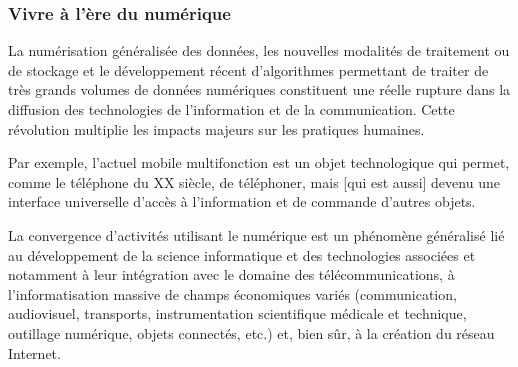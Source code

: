 \subsubsection*{Vivre à l'ère du numérique}

La numérisation généralisée des données, les nouvelles modalités de traitement ou de stockage et le développement récent d’algorithmes permettant de traiter de très grands volumes de données numériques constituent une réelle rupture dans la diffusion des technologies de l’information et de la communication. Cette révolution multiplie les impacts majeurs sur les pratiques humaines.

Par exemple, l’actuel mobile multifonction est un objet technologique qui permet, comme le téléphone du XX siècle, de téléphoner, mais [qui est aussi] devenu une interface universelle d’accès à l’information et de commande d’autres objets.

La convergence d’activités utilisant le numérique est un phénomène généralisé lié au développement de la science informatique et des technologies associées et notamment à leur intégration avec le domaine des télécommunications, à l’informatisation massive de champs économiques variés (communication, audiovisuel, transports, instrumentation scientifique médicale et technique, outillage numérique, objets connectés, etc.) et, bien sûr, à la création du réseau Internet.

